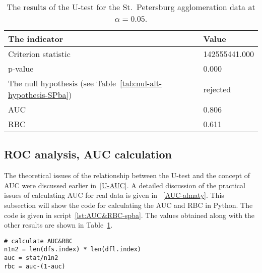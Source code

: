 \documentclass[]{scrreprt}
\begin{document}
%
\begin{table}[htp]
	\caption{The results of the U-test for the St.~Petersburg agglomeration data at $\alpha=0.05$.}\label{tab:u-test-py-result}
	\centering
	\begin{tabular}{ll}
		\hline
		The indicator&Value\\
		\hline
		Criterion statistic&142555441.000\\
		\hline
		p-value&0.000\\
		\hline
		The null hypothesis (see Table~\ref{tab:nul-alt-hypothesis-SPba})&rejected\\
		\hline
		AUC&0.806\\
		\hline
		RBC&0.611\\
		\hline
	\end{tabular}
\end{table}
%
\subsection{ROC analysis, AUC calculation}
The theoretical issues of the relationship between the U-test and the concept of AUC were discussed earlier in~\ref{U-AUC}. A detailed discussion of the practical issues of calculating AUC for real data is given in ~\ref{AUC-almaty}. This subsection will show the code for calculating the AUC and RBC in Python. The code is given in script~\ref{lst:AUC&RBC-spba}. The values obtained along with the other results are shown in Table~\ref{tab:u-test-py-result}.
%
\begin{lstlisting}[float=htp, caption = Calculation of AUC and RBC for St.~Petersburg agglomeration data, firstnumber=1, label= lst:AUC&RBC-spba]
# calculate AUC&RBC
n1n2 = len(dfs.index) * len(dfl.index)
auc = stat/n1n2
rbc = auc-(1-auc)
\end{lstlisting}  
%
\end{document}
